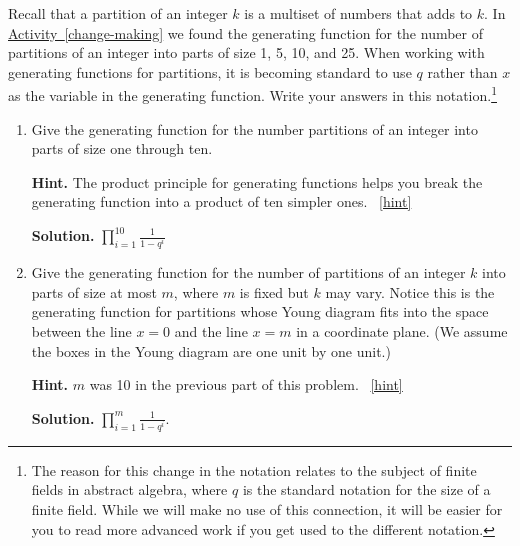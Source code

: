 \documentclass{book}
\begin{document}
\setcounter{project}{317}
\addtocounter{project}{-1}
\begin{activity}[]\label{activity-310}
\hypertarget{p-1595}{}%
Recall that a partition of an integer \(k\) is a multiset of numbers that adds to \(k\). In \hyperref[change-making]{Activity~\ref{change-making}} we found the generating function for the number of partitions of an integer into parts of size 1, 5, 10, and 25. When working with generating functions for partitions, it is becoming standard to use \(q\) rather than \(x\) as the variable in the generating function.  Write your answers in this notation.\footnote{The reason for this change in the notation relates to the subject of finite fields in abstract algebra, where \(q\) is the standard notation for the size of a finite field.  While we will make no use of this connection, it will be easier for you to read more advanced work if you get used to the different notation.\label{fn-20}}%
\begin{enumerate}[font=\bfseries,label=(\alph*),ref=\alph*]
\item\label{task-272} \hypertarget{p-1596}{}%
Give the generating function for the number partitions of an integer into parts of size one through ten.%
\par\smallskip%
\noindent\textbf{Hint.}\hypertarget{hint-205}{}\quad%
\hypertarget{p-1597}{}%
The product principle for generating functions helps you break the generating function into a product of ten simpler ones.%
~\hfill{\tiny\hyperlink{a-317.a}{[hint]}\hypertarget{q-317.a}{}}\par\smallskip%
\noindent\textbf{Solution.}\hypertarget{solution-220}{}\quad%
\hypertarget{p-1598}{}%
\(\prod_{i=1}^{10}\frac{1}{1-q^i}\)%
\item\label{largestpartatmostm} \hypertarget{p-1599}{}%
Give the generating function for the number of partitions of an integer \(k\) into parts of size at most \(m\), where \(m\) is fixed but \(k\) may vary. Notice this is the generating function for partitions whose Young diagram fits into the space between the line \(x=0\) and the line \(x=m\) in a coordinate plane. (We assume the boxes in the Young diagram are one unit by one unit.)%
\par\smallskip%
\noindent\textbf{Hint.}\hypertarget{hint-206}{}\quad%
\hypertarget{p-1600}{}%
\(m\) was 10 in the previous part of this problem.%
~\hfill{\tiny\hyperlink{a-317.b}{[hint]}\hypertarget{q-317.b}{}}\par\smallskip%
\noindent\textbf{Solution.}\hypertarget{solution-221}{}\quad%
\hypertarget{p-1601}{}%
\(\prod_{i=1}^m\frac{1}{1-q^i}\).%
\end{enumerate}
\end{activity}
\end{document}
